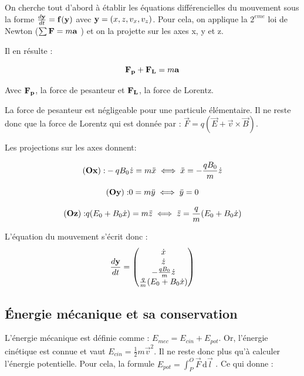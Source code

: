 \documentclass[a4paper,12pt,twoside]{article}
\begin{document}
		On cherche tout d'abord \`a \'etablir les \'equations diff\'erencielles du mouvement sous la forme $\frac{d\bf y}{dt} = {\bf f(\bf{y}})$ avec ${\bf y} = (x, z, v_x, v_z)$. 
		Pour cela, on applique la $2^{eme}$ loi de Newton ($\sum{\bf F} = m \bf a$ ) et on la projette sur les axes x, y et z.
		
		Il en r\'esulte :
		
		\begin{equation}
			{\bf F_p  + F_L} = m \bf{a}
		\end{equation}
		
		Avec ${\bf F_p}$, la force de pesanteur et ${\bf F_L}$, la force de Lorentz.
		
		La force de pesanteur est n\'egligeable pour une particule \'el\'ementaire. Il ne reste donc que la force de Lorentz qui est donn\'ee par : $\vec{F} = q(\vec{E}+\vec{v} \times \vec{B})$.
		
		Les projections sur les axes donnent:
		
		\begin{equation}\label{xpp}
			{\bf(Ox):} -qB_0 \dot{z} = m \ddot{x}  \iff \ddot{x} = -\frac{qB_0}{m} \dot{z}
		\end{equation}
		
		\begin{equation}
			{\bf(Oy):}  0 = m \ddot{y} \iff \ddot{y} = 0
		\end{equation}
		
		\begin{equation}\label{zpp}
			{\bf(Oz):}  q(E_0 + B_0\dot{x}) = m \ddot{z} \iff \ddot{z} = \frac{q}{m} (E_0+B_0 \dot{x}) 
		\end{equation}
		
		L'\'equation du mouvement s'\'ecrit donc :
		\begin{equation}
		\frac{d\bf y}{dt} = \begin{pmatrix}  \dot x \\ \dot z \\ -\frac{qB_0}{m} \dot{z} \\ \frac{q}{m} (E_0+B_0 \dot{x}) \end{pmatrix}
		\end{equation}
		

	\subsection{\'Energie m\'ecanique et sa conservation}
	
		L'\'energie m\'ecanique est d\'efinie comme : $E_{mec} = E_{cin} + E_{pot}$. Or, l'\'energie cin\'etique est connue et vaut $E_{cin} = \frac{1}{2} m {\vec{v}}^2$.
		Il ne reste donc plus qu'\`a calculer l'\'energie potentielle. Pour cela, la formule $E_{pot} = \int_P^O \vec{F}\, \mathrm d\vec{l}$ \cite{FT}. Ce qui donne :
	
\end{document}
